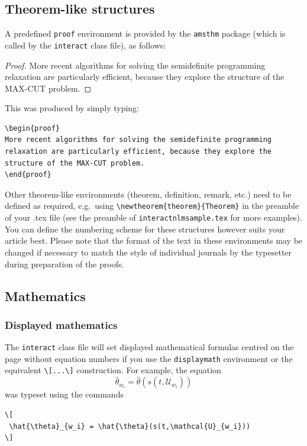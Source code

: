 \documentclass[]{interact}
\theoremstyle{plain}%
\theoremstyle{definition}
\theoremstyle{remark}
\begin{document}
\subsection{Theorem-like structures}

A predefined \verb"proof" environment is provided by the \texttt{amsthm} package (which is called by the \texttt{interact} class file), as follows:
\begin{proof}
More recent algorithms for solving the semidefinite programming relaxation are particularly efficient, because they explore the structure of the MAX-CUT problem.
\end{proof}
\noindent This was produced by simply typing:
\begin{verbatim}
\begin{proof}
More recent algorithms for solving the semidefinite programming
relaxation are particularly efficient, because they explore the
structure of the MAX-CUT problem.
\end{proof}
\end{verbatim}
Other theorem-like environments (theorem, definition, remark, etc.) need to be defined as required, e.g.\ using \verb"\newtheorem{theorem}{Theorem}" in the preamble of your .tex file (see the preamble of \verb"interactnlmsample.tex" for more examples). You can define the numbering scheme for these structures however suits your article best. Please note that the format of the text in these environments may be changed if necessary to match the style of individual journals by the typesetter during preparation of the proofs.


\subsection{Mathematics}

\subsubsection{Displayed mathematics}

The \texttt{interact} class file will set displayed mathematical formulas centred on the page without equation numbers if you use the \texttt{displaymath} environment or the equivalent \verb"\[...\]" construction. For example, the equation
\[
 \hat{\theta}_{w_i} = \hat{\theta}(s(t,\mathcal{U}_{w_i}))
\]
was typeset using the commands
\begin{verbatim}
\[
 \hat{\theta}_{w_i} = \hat{\theta}(s(t,\mathcal{U}_{w_i}))
\]
\end{verbatim}
\end{document}
